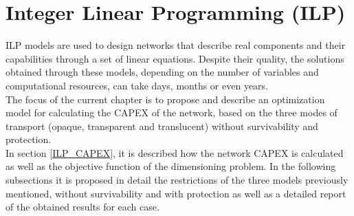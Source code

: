 
\chapter{Integer Linear Programming (ILP)}

ILP models are used to design networks that describe real components and their capabilities through a set of linear equations. Despite their quality, the solutions obtained through these models, depending on the number of variables and computational resources, can take days, months or even years.\\
The focus of the current chapter is to propose and describe an optimization model for calculating the CAPEX of the network, based on the three modes of transport (opaque, transparent and translucent) without survivability and protection.\\
In section \ref{ILP_CAPEX}, it is described how the network CAPEX is calculated as well as the objective function of the dimensioning problem. In the following subsections it is proposed in detail the restrictions of the three models previously mentioned, without survivability and with protection as well as a detailed report of the obtained results for each case.\\










